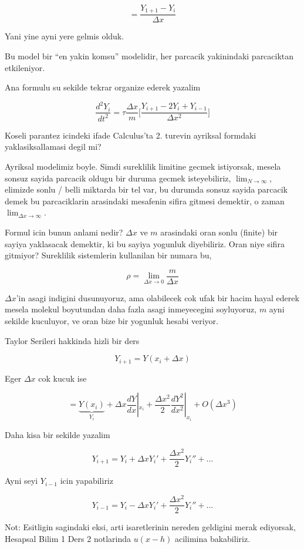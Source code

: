 \documentclass[12pt,fleqn]{article}
\begin{document}
\[ = \frac{Y_{1+1}-Y_i}{\Delta x} \]

Yani yine ayni yere gelmis olduk. 

Bu model bir ``en yakin komsu'' modelidir, her parcacik yakinindaki
parcaciktan etkileniyor. 

Ana formulu su sekilde tekrar organize ederek yazalim

\[ \frac{d^2Y_i}{dt^2} = 
\tau \frac{\Delta x}{m} \bigg[
\frac{Y_{i+1} - 2Y_i + Y_{i-1}}{\Delta x^2}
\bigg]
\]

Koseli parantez icindeki ifade Calculus'ta 2. turevin ayriksal formdaki
yaklasiksallamasi degil mi?

Ayriksal modelimiz boyle. Simdi sureklilik limitine gecmek istiyorsak,
mesela sonsuz sayida parcacik oldugu bir duruma gecmek isteyebiliriz,
$\lim_{N \to \infty}$, elimizde sonlu / belli miktarda bir tel var, bu durumda 
sonsuz sayida parcacik demek bu parcaciklarin arasindaki mesafenin sifira 
gitmesi demektir, o zaman $\lim_{\Delta x \to \infty}$. 

Formul icin bunun anlami nedir? $\Delta x$ ve $m$ arasindaki oran sonlu
(finite) bir sayiya yaklasacak demektir, ki bu sayiya yogunluk
diyebiliriz. Oran niye sifira gitmiyor? Sureklilik sistemlerin kullanilan
bir numara bu,

\[ \rho = \lim_{\Delta x \to 0} \frac{m}{\Delta x} \]

$\Delta x$'in asagi indigini dusunuyoruz, ama olabilecek cok ufak bir hacim
hayal ederek mesela molekul boyutundan daha fazla asagi inmeyecegini
soyluyoruz, $m$ ayni sekilde kuculuyor, ve oran bize bir yogunluk hesabi
veriyor.

Taylor Serileri hakkinda hizli bir ders

\[ Y_{i+1}=Y(x_i + \Delta x) \]

Eger $\Delta x$ cok kucuk ise

\[ = 
\underbrace{Y(x_i)}_{Y_i} + \Delta x \frac{dY}{dx}|_{x_i} + 
\frac{\Delta x^2}{2}\frac{dY^2}{dx^2}|_{x_i} + 
O(\Delta x^3)
\]

Daha kisa bir sekilde yazalim

\[ Y_{i+1} = Y_i + \Delta x Y_i' + \frac{\Delta x^2}{2}Y_i'' + ... 
\]

Ayni seyi $Y_{i-1}$ icin yapabiliriz

\[ Y_{i-1} = Y_i - \Delta x Y_i' + \frac{\Delta x^2}{2}Y_i'' + ... 
\]

Not: Esitligin sagindaki eksi, arti isaretlerinin nereden geldigini merak
ediyorsak, Hesapsal Bilim 1 Ders 2 notlarinda $u(x-h)$ acilimina
bakabiliriz.
\end{document}
